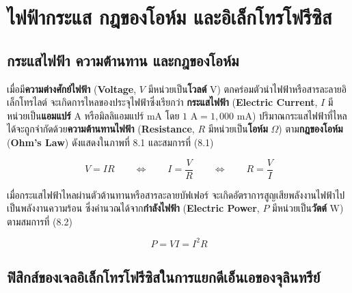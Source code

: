 \chapter{ไฟฟ้ากระแส กฎของโอห์ม และอิเล็กโทรโฟรีซิส}

\section{กระแสไฟฟ้า ความต้านทาน และกฎของโอห์ม}


เมื่อมี\textbf{ความต่างศักย์ไฟฟ้า} (\textbf{Voltage}, $V$ มีหน่วยเป็น\textbf{โวลต์} $\text{V}$) ตกคร่อมตัวนำไฟฟ้าหรือสารละลายอิเล็กโทรไลต์ จะเกิดการไหลของประจุไฟฟ้าซึ่งเรียกว่า \textbf{กระแสไฟฟ้า} (\textbf{Electric Current}, $I$ มีหน่วยเป็น\textbf{แอมแปร์} $\text{A}$ หรือมิลลิแอมแปร์ $\text{mA}$ โดย $1\text{ A} = 1{,}000\text{ mA}$) ปริมาณกระแสไฟฟ้าที่ไหลได้จะถูกจำกัดด้วย\textbf{ความต้านทานไฟฟ้า} (\textbf{Resistance}, $R$ มีหน่วยเป็น\textbf{โอห์ม} $\Omega$) ตาม\textbf{กฎของโอห์ม} (\textbf{Ohm's Law}) ดังแสดงใน\mbox{ภาพที่} 8.1 และสมการที่ (8.1)

\begin{equation}
    V = I R \qquad \Longleftrightarrow \qquad I = \frac{V}{R} \qquad \Longleftrightarrow \qquad R = \frac{V}{I}
\end{equation}

เมื่อกระแสไฟฟ้าไหลผ่านตัวต้านทานหรือสารละลายบัฟเฟอร์ จะเกิดอัตราการสูญเสียพลังงานไฟฟ้าไปเป็นพลังงานความร้อน ซึ่งคำนวณได้จาก\textbf{กำลังไฟฟ้า} (\textbf{Electric Power}, $P$ มีหน่วยเป็น\textbf{วัตต์} $\text{W}$) ตามสมการที่ (8.2)

\begin{equation}
    P = V I = I^2 R
\end{equation}

\section{ฟิสิกส์ของเจลอิเล็กโทรโฟรีซิสในการแยกดีเอ็นเอของจุลินทรีย์}


